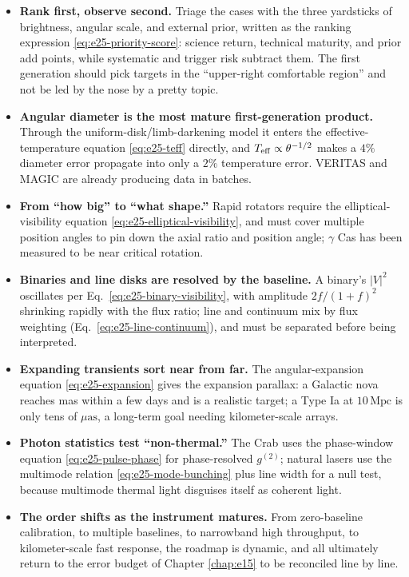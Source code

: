 \begin{itemize}
  \item \textbf{Rank first, observe second.} Triage the cases with the three yardsticks of brightness, angular scale, and external prior, written as the ranking expression \eqref{eq:e25-priority-score}: science return, technical maturity, and prior add points, while systematic and trigger risk subtract them. The first generation should pick targets in the ``upper-right comfortable region'' and not be led by the nose by a pretty topic.
  \item \textbf{Angular diameter is the most mature first-generation product.} Through the uniform-disk/limb-darkening model it enters the effective-temperature equation \eqref{eq:e25-teff} directly, and \(T_{\rm eff}\propto\theta^{-1/2}\) makes a \(4\%\) diameter error propagate into only a \(2\%\) temperature error. VERITAS and MAGIC are already producing data in batches.
  \item \textbf{From ``how big'' to ``what shape.''} Rapid rotators require the elliptical-visibility equation \eqref{eq:e25-elliptical-visibility}, and must cover multiple position angles to pin down the axial ratio and position angle; \(\gamma\) Cas has been measured to be near critical rotation.
  \item \textbf{Binaries and line disks are resolved by the baseline.} A binary's \(|V|^2\) oscillates per Eq.\ \eqref{eq:e25-binary-visibility}, with amplitude \(2f/(1+f)^2\) shrinking rapidly with the flux ratio; line and continuum mix by flux weighting (Eq.\ \eqref{eq:e25-line-continuum}), and must be separated before being interpreted.
  \item \textbf{Expanding transients sort near from far.} The angular-expansion equation \eqref{eq:e25-expansion} gives the expansion parallax: a Galactic nova reaches mas within a few days and is a realistic target; a Type Ia at \(10\,\mathrm{Mpc}\) is only tens of \(\mu\mathrm{as}\), a long-term goal needing kilometer-scale arrays.
  \item \textbf{Photon statistics test ``non-thermal.''} The Crab uses the phase-window equation \eqref{eq:e25-pulse-phase} for phase-resolved \(g^{(2)}\); natural lasers use the multimode relation \eqref{eq:e25-mode-bunching} plus line width for a null test, because multimode thermal light disguises itself as coherent light.
  \item \textbf{The order shifts as the instrument matures.} From zero-baseline calibration, to multiple baselines, to narrowband high throughput, to kilometer-scale fast response, the roadmap is dynamic, and all ultimately return to the error budget of Chapter \ref{chap:e15} to be reconciled line by line.
\end{itemize}

